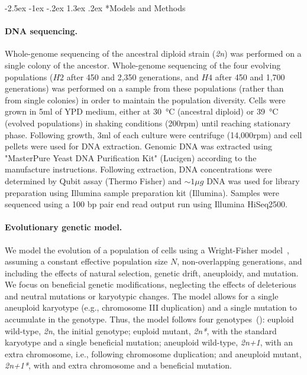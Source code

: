 \documentclass[12pt]{extarticle}
\makeatletter
\renewcommand\section{\@startsection {section}{1}{\z@}%
     {-2.5ex \@plus -1ex \@minus -.2ex}%
     {1.3ex \@plus.2ex}%
    {\Large\bfseries}}
\newcommand{\euwt}{\emph{2n}}
\newcommand{\anwt}{\emph{2n+1}}
\newcommand{\eumt}{\emph{2n*}}
\newcommand{\anmt}{\emph{2n+1*}}
\makeatother
\begin{document}
\section*{Models and Methods}

\paragraph{DNA sequencing.}
Whole-genome sequencing of the ancestral diploid strain (\euwt) was performed
on a single colony of the ancestor. Whole-genome sequencing of the four evolving populations ($H2$ after 450 and 2,350 generations, and $H4$ after 450 and 1,700 generations) was performed on a sample from these populations (rather than from single colonies) in order to maintain the population diversity. Cells were grown in 5ml of YPD medium, either at \SI{30}{\celsius} (ancestral diploid) or \SI{39}{\celsius} (evolved populations) in shaking conditions (200rpm) until reaching stationary phase. Following growth, 3ml of each culture were centrifuge (14,000rpm) and cell pellets were used for DNA extraction. 
Genomic DNA was extracted using "MasterPure Yeast DNA Purification Kit" (Lucigen) according to the manufacture instructions. Following extraction, DNA concentrations were determined by Qubit assay (Thermo Fisher) and $\sim1\mu g$ DNA was used for library preparation using Illumina sample preparation kit (Illumina). Samples were sequenced using a 100 bp pair end read output run using Illumina HiSeq2500.  

\paragraph{Evolutionary genetic model.}
We model the evolution of a population of cells using a Wright-Fisher model~\citep{Otto2007}, assuming a constant effective population size $N$, non-overlapping generations, and including the effects of natural selection, genetic drift, aneuploidy, and mutation. 
We focus on beneficial genetic modifications, neglecting the effects of deleterious and neutral mutations or karyotypic changes.
The model allows for a single aneuploid karyotype (e.g., chromosome III duplication) and a single mutation to accumulate in the genotype.
Thus, the model follows four genotypes~(): euploid wild-type, \euwt, the initial genotype; 
euploid mutant, \eumt, with the standard karyotype and a single beneficial mutation; 
aneuploid wild-type, \anwt, with an extra chromosome, i.e., following chromosome duplication; and
aneuploid mutant, \anmt, with and extra chromosome and a beneficial mutation. 
\end{document}
